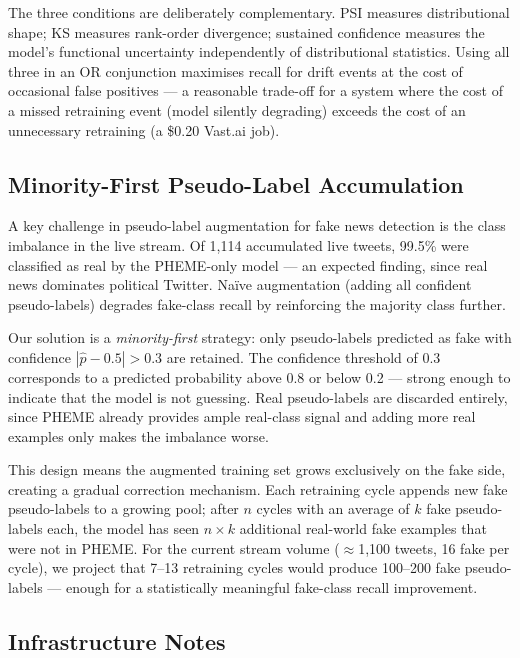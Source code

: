 \documentclass[sigconf]{acmart}
\begin{document}
The three conditions are deliberately complementary. PSI measures distributional shape;
KS measures rank-order divergence; sustained confidence measures the model's functional
uncertainty independently of distributional statistics. Using all three in an OR conjunction
maximises recall for drift events at the cost of occasional false positives — a reasonable
trade-off for a system where the cost of a missed retraining event (model silently degrading)
exceeds the cost of an unnecessary retraining (a \$0.20 Vast.ai job).

\subsection{Minority-First Pseudo-Label Accumulation}
\label{sec:minority_first}

A key challenge in pseudo-label augmentation for fake news detection is the class imbalance
in the live stream. Of 1,114 accumulated live tweets, 99.5\% were classified as real by the
PHEME-only model — an expected finding, since real news dominates political Twitter. Naïve
augmentation (adding all confident pseudo-labels) degrades fake-class recall by reinforcing
the majority class further.

Our solution is a \textit{minority-first} strategy: only pseudo-labels predicted as fake
with confidence $|\hat{p} - 0.5| > 0.3$ are retained. The confidence threshold of 0.3
corresponds to a predicted probability above 0.8 or below 0.2 — strong enough to indicate
that the model is not guessing. Real pseudo-labels are discarded entirely, since PHEME already
provides ample real-class signal and adding more real examples only makes the imbalance worse.

This design means the augmented training set grows exclusively on the fake side, creating
a gradual correction mechanism. Each retraining cycle appends new fake pseudo-labels to a
growing pool; after $n$ cycles with an average of $k$ fake pseudo-labels each, the model
has seen $n \times k$ additional real-world fake examples that were not in PHEME. For the
current stream volume ($\approx$1,100 tweets, 16 fake per cycle), we project that 7--13
retraining cycles would produce 100--200 fake pseudo-labels — enough for a statistically
meaningful fake-class recall improvement.

\subsection{Infrastructure Notes}
\end{document}
